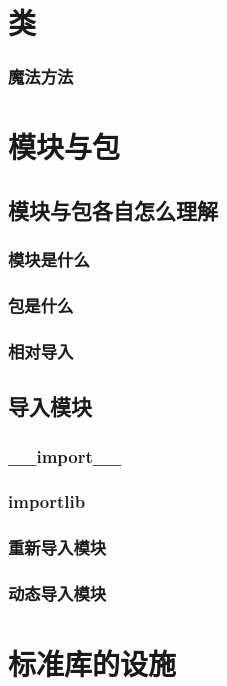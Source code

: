 \documentclass{ctexbook}
\begin{document}
\part{类}

	\section{魔法方法}

\part{模块与包}

	\chapter{模块与包各自怎么理解}
		\section{模块是什么}
		\section{包是什么}
		\section{相对导入}

	\chapter{导入模块}
		\section{\_\_import\_\_}
		\section{importlib}
		\section{重新导入模块}
		\section{动态导入模块}

\part{标准库的设施}
\end{document}
